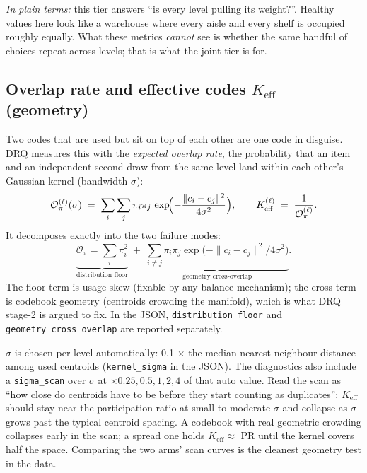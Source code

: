 \documentclass[11pt]{article}
\newcommand{\Keff}{K_{\mathrm{eff}}}
\newcommand{\Opi}{\mathcal{O}_\pi}
\begin{document}
\emph{In plain terms:} this tier answers ``is every level pulling its weight?''.
Healthy values here look like a warehouse where every aisle and every shelf is
occupied roughly equally. What these metrics \emph{cannot} see is whether the
same handful of choices repeat across levels; that is what the joint tier is
for.

\subsection{Overlap rate and effective codes $\Keff$ (geometry)}
\label{sec:overlap}

Two codes that are used but sit on top of each other are one code in disguise.
DRQ measures this with the \emph{expected overlap rate}, the probability that an
item and an independent second draw from the same level land within each other's
Gaussian kernel (bandwidth $\sigma$):
\begin{equation}
  \Opi^{(\ell)}(\sigma) \;=\; \sum_{i}\sum_{j} \pi_i \pi_j\,
    \exp\!\Bigl(-\frac{\|c_i - c_j\|^2}{4\sigma^2}\Bigr),
  \qquad
  \Keff^{(\ell)} \;=\; \frac{1}{\Opi^{(\ell)}} .
  \label{eq:opiq}
\end{equation}
It decomposes exactly into the two failure modes:
\begin{equation}
  \underbrace{\Opi = \sum_i \pi_i^2}_{\text{distribution floor}}
  \;+\;
  \underbrace{\sum_{i\neq j} \pi_i\pi_j \exp\!\bigl(-\|c_i-c_j\|^2/4\sigma^2\bigr)}
  _{\text{geometry cross-overlap}} .
  \label{eq:split}
\end{equation}
The floor term is usage skew (fixable by any balance mechanism); the cross term
is codebook geometry (centroids crowding the manifold), which is what DRQ
stage-2 is argued to fix. In the JSON, \texttt{distribution\_floor} and
\texttt{geometry\_cross\_overlap} are reported separately.

$\sigma$ is chosen per level automatically: 0.1 $\times$ the median
nearest-neighbour distance among used centroids
(\texttt{kernel\_sigma} in the JSON). The diagnostics also include a
\texttt{sigma\_scan} over $\sigma$ at $\times0.25, 0.5, 1, 2, 4$ of that auto
value. Read the scan as ``how close do centroids have to be before they start
counting as duplicates'': $\Keff$ should stay near the participation ratio at
small-to-moderate $\sigma$ and collapse as $\sigma$ grows past the typical
centroid spacing. A codebook with real geometric crowding collapses early in
the scan; a spread one holds $\Keff \approx$ PR until the kernel covers
half the space. Comparing the two arms' scan curves is the cleanest geometry
test in the data.
\end{document}
